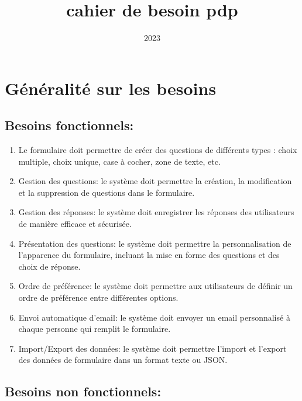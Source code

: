 \documentclass{article}
\title{cahier de besoin pdp}
\date{2023}
\begin{document}
\maketitle
\newpage

\section{Généralité sur les besoins}

\subsection{Besoins fonctionnels:}
\begin{enumerate}

\item Le formulaire doit permettre de créer des questions de différents types : choix multiple, choix unique, case à cocher, zone de texte, etc.

\item Gestion des questions: le système doit permettre la création, la modification et la suppression de questions dans le formulaire.
\item Gestion des réponses: le système doit enregistrer les réponses des utilisateurs de manière efficace et sécurisée.
\item Présentation des questions: le système doit permettre la personnalisation de l'apparence du formulaire, incluant la mise en forme des questions et des choix de réponse.
\item Ordre de préférence: le système doit permettre aux utilisateurs de définir un ordre de préférence entre différentes options.
\item Envoi automatique d'email: le système doit envoyer un email personnalisé à chaque personne qui remplit le formulaire.
\item Import/Export des données: le système doit permettre l'import et l'export des données de formulaire dans un format texte ou JSON.
\end{enumerate}

\subsection{Besoins non fonctionnels:}
\end{document}

